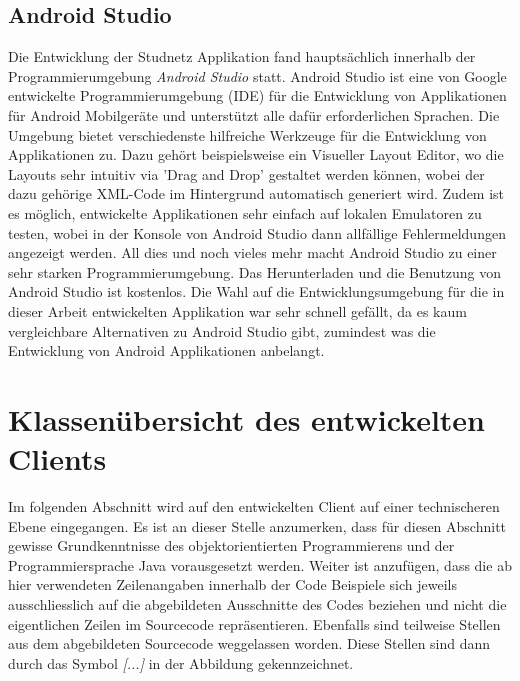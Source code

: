 \documentclass[../main.tex]{subfiles}
\begin{document}
	\subsection{Android Studio}
	Die Entwicklung der Studnetz Applikation fand hauptsächlich innerhalb der Programmierumgebung \emph{Android Studio} statt. Android Studio ist eine von Google entwickelte Programmierumgebung (IDE) für die Entwicklung von Applikationen für Android Mobilgeräte und unterstützt alle dafür erforderlichen Sprachen. Die Umgebung bietet verschiedenste hilfreiche Werkzeuge für die Entwicklung von Applikationen zu. Dazu gehört beispielsweise ein Visueller Layout Editor, wo die Layouts sehr intuitiv via 'Drag and Drop' gestaltet werden können, wobei der dazu gehörige XML-Code im Hintergrund automatisch generiert wird. Zudem ist es möglich, entwickelte Applikationen sehr einfach auf lokalen Emulatoren zu testen, wobei in der Konsole von Android Studio dann allfällige Fehlermeldungen angezeigt werden. All dies und noch vieles mehr macht Android Studio zu einer sehr starken Programmierumgebung. Das Herunterladen und die Benutzung von Android Studio ist kostenlos. Die Wahl auf die Entwicklungsumgebung für die in dieser Arbeit entwickelten Applikation war sehr schnell gefällt, da es kaum vergleichbare Alternativen zu Android Studio gibt, zumindest was die Entwicklung von Android Applikationen anbelangt.
	
	\section{Klassenübersicht des entwickelten Clients}
	Im folgenden Abschnitt wird auf den entwickelten Client auf einer technischeren Ebene eingegangen. Es ist an dieser Stelle anzumerken, dass für diesen Abschnitt gewisse Grundkenntnisse des objektorientierten Programmierens und der Programmiersprache Java vorausgesetzt werden. Weiter ist anzufügen, dass die ab hier verwendeten Zeilenangaben innerhalb der Code Beispiele sich jeweils ausschliesslich auf die abgebildeten Ausschnitte des Codes beziehen und nicht die eigentlichen Zeilen im Sourcecode repräsentieren. Ebenfalls sind teilweise Stellen aus dem abgebildeten Sourcecode weggelassen worden. Diese Stellen sind dann durch das Symbol \emph{[...]} in der Abbildung gekennzeichnet.
	
	
\end{document}
